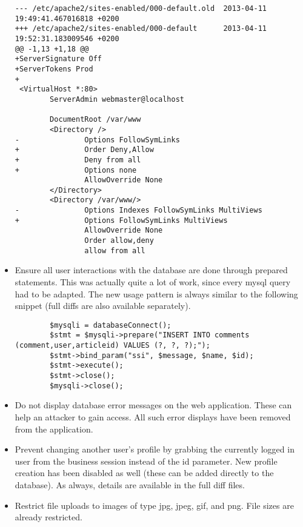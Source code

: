 \documentclass[a4paper,10pt]{article}
\begin{document}
\begin{itemize}
\begin{verbatim}
--- /etc/apache2/sites-enabled/000-default.old  2013-04-11 19:49:41.467016818 +0200
+++ /etc/apache2/sites-enabled/000-default      2013-04-11 19:52:31.183009546 +0200
@@ -1,13 +1,18 @@
+ServerSignature Off
+ServerTokens Prod
+
 <VirtualHost *:80>
        ServerAdmin webmaster@localhost
 
        DocumentRoot /var/www
        <Directory />
-               Options FollowSymLinks
+               Order Deny,Allow
+               Deny from all
+               Options none
                AllowOverride None
        </Directory>
        <Directory /var/www/>
-               Options Indexes FollowSymLinks MultiViews
+               Options FollowSymLinks MultiViews
                AllowOverride None
                Order allow,deny
                allow from all

\end{verbatim}

\item Ensure all user interactions with the database are done through prepared statements.
      This was actually quite a lot of work, since every mysql query had to be adapted. The new usage
      pattern is always similar to the following snippet (full diffs are also available separately).
      
\lstset{language=php}
\begin{lstlisting}
        $mysqli = databaseConnect();         
        $stmt = $mysqli->prepare("INSERT INTO comments (comment,user,articleid) VALUES (?, ?, ?);");
        $stmt->bind_param("ssi", $message, $name, $id);
        $stmt->execute();
        $stmt->close();
        $mysqli->close();
\end{lstlisting}

\item Do not display database error messages on the web application. These can help an attacker
      to gain access. All such error displays have been removed from the application.

\item Prevent changing another user's profile by grabbing the currently logged in user from
      the business session instead of the id parameter. New profile creation has been disabled as well (these can be added directly to the database).
      As always, details are available in the full diff files.

\item Restrict file uploads to images of type jpg, jpeg, gif, and png. File sizes are already
      restricted.
      

\end{itemize}
\end{document}
